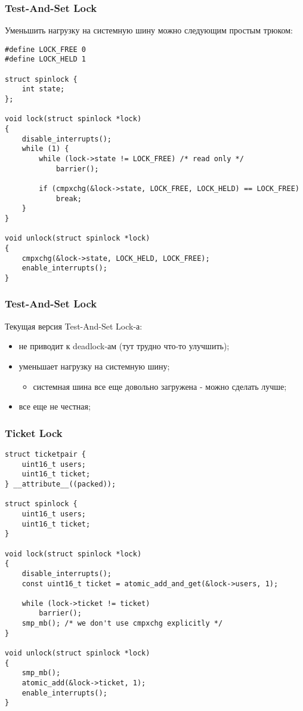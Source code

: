 \begin{frame}[fragile]
\frametitle{Test-And-Set Lock}

Уменьшить нагрузку на системную шину можно следующим простым трюком:

\begin{lstlisting}
#define LOCK_FREE 0
#define LOCK_HELD 1

struct spinlock {
    int state;
};

void lock(struct spinlock *lock)
{
    disable_interrupts();
    while (1) {
        while (lock->state != LOCK_FREE) /* read only */
            barrier();

        if (cmpxchg(&lock->state, LOCK_FREE, LOCK_HELD) == LOCK_FREE)
            break;
    }
}

void unlock(struct spinlock *lock)
{
    cmpxchg(&lock->state, LOCK_HELD, LOCK_FREE);
    enable_interrupts();
}
\end{lstlisting}
\end{frame}

\begin{frame}
\frametitle{Test-And-Set Lock}

Текущая версия Test-And-Set Lock-а:
\begin{itemize}
  \item не приводит к deadlock-ам (тут трудно что-то улучшить);
  \item уменьшает нагрузку на системную шину;
        \begin{itemize}
          \item системная шина все еще довольно загружена - можно сделать лучше;
        \end{itemize}
  \item все еще не честная;
\end{itemize}
\end{frame}

\begin{frame}[fragile]
\frametitle{Ticket Lock}

\begin{lstlisting}
struct ticketpair {
    uint16_t users;
    uint16_t ticket;
} __attribute__((packed));

struct spinlock {
    uint16_t users;
    uint16_t ticket;
}

void lock(struct spinlock *lock)
{
    disable_interrupts();
    const uint16_t ticket = atomic_add_and_get(&lock->users, 1);

    while (lock->ticket != ticket)
        barrier();
    smp_mb(); /* we don't use cmpxchg explicitly */
}

void unlock(struct spinlock *lock)
{
    smp_mb();
    atomic_add(&lock->ticket, 1);
    enable_interrupts();
}
\end{lstlisting}
\end{frame}

